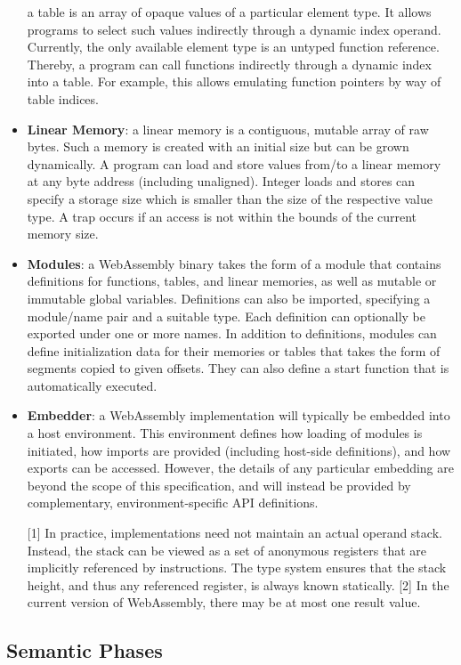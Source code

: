 \begin{itemize}
  a table is an array of opaque values of a particular element type. It allows programs to select such values indirectly through a dynamic index operand. Currently, the only available element type is an untyped function reference. Thereby, a program can call functions indirectly through a dynamic index into a table. For example, this allows emulating function pointers by way of table indices.
  \item \textbf{Linear Memory}:
  a linear memory is a contiguous, mutable array of raw bytes. Such a memory is created with an initial size but can be grown dynamically. A program can load and store values from/to a linear memory at any byte address (including unaligned). Integer loads and stores can specify a storage size which is smaller than the size of the respective value type. A trap occurs if an access is not within the bounds of the current memory size.
  \item \textbf{Modules}:
  a WebAssembly binary takes the form of a module that contains definitions for functions, tables, and linear memories, as well as mutable or immutable global variables. Definitions can also be imported, specifying a module/name pair and a suitable type. Each definition can optionally be exported under one or more names. In addition to definitions, modules can define initialization data for their memories or tables that takes the form of segments copied to given offsets. They can also define a start function that is automatically executed.
  \item \textbf{Embedder}:
  a WebAssembly implementation will typically be embedded into a host environment. This environment defines how loading of modules is initiated, how imports are provided (including host-side definitions), and how exports can be accessed. However, the details of any particular embedding are beyond the scope of this specification, and will instead be provided by complementary, environment-specific API definitions.
  
  [1]	In practice, implementations need not maintain an actual operand stack. Instead, the stack can be viewed as a set of anonymous registers that are implicitly referenced by instructions. The type system ensures that the stack height, and thus any referenced register, is always known statically.
  [2]	In the current version of WebAssembly, there may be at most one result value.
\end{itemize}

\subsection{Semantic Phases} \mbox{}

